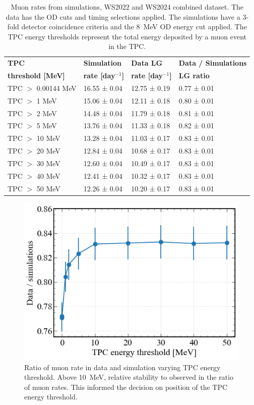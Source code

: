 \begin{table}[ht!]
    \centering
    \caption{Muon rates from simulations, WS2022 and WS2024 combined dataset. The data has the OD cuts and timing selections applied. The simulations have a 3-fold detector coincidence criteria and the 8~MeV OD energy cut applied. The TPC energy thresholds represent the total energy deposited by a muon event in the TPC.}
    \begin{tabular}{llll}
    \hline\hline
    \textbf{TPC} & \textbf{Simulation} & \textbf{Data LG} & \textbf{Data / Simulations} \\
    \textbf{threshold [MeV]} & \textbf{rate [day$^{-1}$]} & \textbf{rate [day$^{-1}$]} & \textbf{LG ratio}\\
    \hline
    TPC $>$ 0.00144 MeV & 16.55 ± 0.04 & 12.75 ± 0.19 & 0.77 ± 0.01 \\ 
    TPC $>$ 1 MeV & 15.06 ± 0.04 & 12.11 ± 0.18 & 0.80 ± 0.01\\ 
    TPC $>$ 2 MeV & 14.48 ± 0.04 & 11.79 ± 0.18 & 0.81 ± 0.01 \\ 
    TPC $>$ 5 MeV & 13.76 ± 0.04 & 11.33 ± 0.18 & 0.82 ± 0.01  \\ 
    TPC $>$ 10 MeV & 13.28 ± 0.04 & 11.03 ± 0.17 & 0.83 ± 0.01 \\ 
    TPC $>$ 20 MeV & 12.84 ± 0.04 & 10.68 ± 0.17 & 0.83 ± 0.01  \\ 
    TPC $>$ 30 MeV & 12.60 ± 0.04 & 10.49 ± 0.17 & 0.83 ± 0.01  \\ 
    TPC $>$ 40 MeV & 12.41 ± 0.04 & 10.32 ± 0.17 & 0.83 ± 0.01  \\ 
    TPC $>$ 50 MeV & 12.26 ± 0.04 & 10.20 ± 0.17 & 0.83 ± 0.01 \\
    \hline\hline
    \end{tabular}
    \label{tab:Muons/Rates_all}
\end{table}

\begin{figure}[ht!]
    \centering
    \includegraphics[width=0.8\linewidth]{figures/Muons/Data_sims_ratio_lgonly-2.pdf}
    \caption{Ratio of muon rate in data and simulation varying TPC energy threshold. Above 10~MeV, relative stability to observed in the ratio of muon rates. This informed the decision on position of the TPC energy threshold.}
    \label{fig:Muons/MuonRatioByTPCThreshold}
\end{figure}

